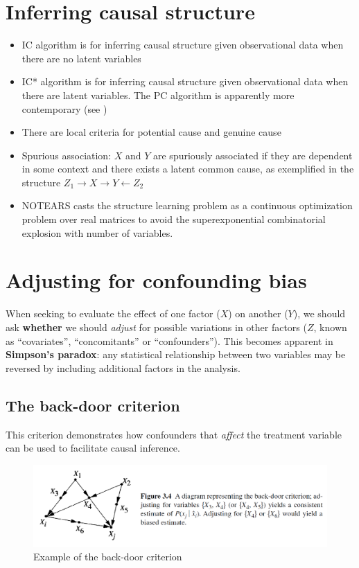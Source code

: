 \documentclass[11pt]{article}
\numberwithin{equation}{section}
\begin{document}
\section{Inferring causal structure}
\begin{itemize}
\item IC algorithm is for inferring causal structure given observational data when there are no latent variables
\item IC* algorithm is for inferring causal structure given observational data when there are latent variables. The PC algorithm is apparently more contemporary (see \cite{spirtes10})
\item There are local criteria for potential cause and genuine cause
\item Spurious association: $X$ and $Y$ are spuriously associated if they are dependent in some context and there exists a latent common cause, as exemplified in the structure $Z_1 \rightarrow X \rightarrow Y \leftarrow Z_2$
\item NOTEARS \citep{zheng18} casts the structure learning problem as a continuous optimization problem over real matrices to avoid the superexponential combinatorial explosion with number of variables.
\end{itemize}

\section{Adjusting for confounding bias}

When seeking to evaluate the effect of one factor ($X$) on another ($Y$), we should ask \textbf{whether} we should \textit{adjust} for possible variations in other factors ($Z$, known as ``covariates'', ``concomitants'' or ``confounders''). This becomes apparent in \textbf{Simpson's paradox}: any statistical relationship between two variables may be reversed by including additional factors in the analysis.

\subsection{The back-door criterion}
This criterion demonstrates how confounders that \textit{affect} the treatment variable can be used to facilitate causal inference.

\begin{figure}
\begin{center}
\includegraphics[width=0.8\columnwidth]{figures/back-door.png}  
\end{center}
\caption{Example of the back-door criterion
}
\label{Fig:front_door}
\end{figure}
\end{document}
